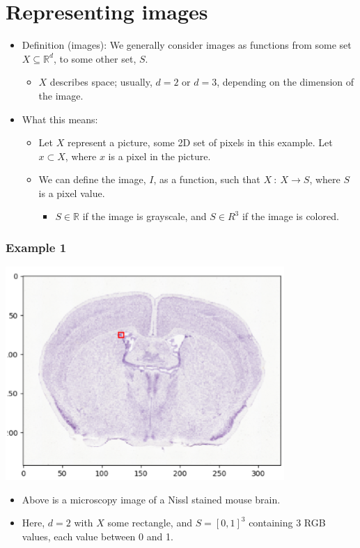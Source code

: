 \documentclass[10pt]{article}
\newcommand{\R}{\mathbb{R}}
\begin{document}
\section*{Representing images}
\begin{itemize}
    \item Definition (images): We generally consider images as functions from some set $X \subseteq \mathbb{R}^d$, to some other set, $S$.
    \begin{itemize}
        \item $X$ describes space; usually, $d = 2$ or $d = 3$, depending on the dimension of the image.
    \end{itemize}
    \item What this means:
    \begin{itemize}
        \item Let $X$ represent a picture, some 2D set of pixels in this example.  Let $x \subset X$, where $x$ is a pixel in the picture.
        \item We can define the image, $I$, as a function, such that $X \::\: X \rightarrow S$, where $S$ is a pixel value.
        \begin{itemize}
            \item $S \in \R$ if the image is grayscale, and $S \in R^3$ if the image is colored.
        \end{itemize}
    \end{itemize}
\end{itemize}

\subsubsection*{Example 1}
\begin{center}
    \includegraphics[scale=1]{W1_1.png}
\end{center}
\begin{itemize}
    \item Above is a microscopy image of a Nissl stained mouse brain.
    \item Here, $d = 2$ with $X$ some rectangle, and $S = [0, 1]^3$ containing $3$ RGB values, each value between 0 and 1.
\end{itemize}
\end{document}
